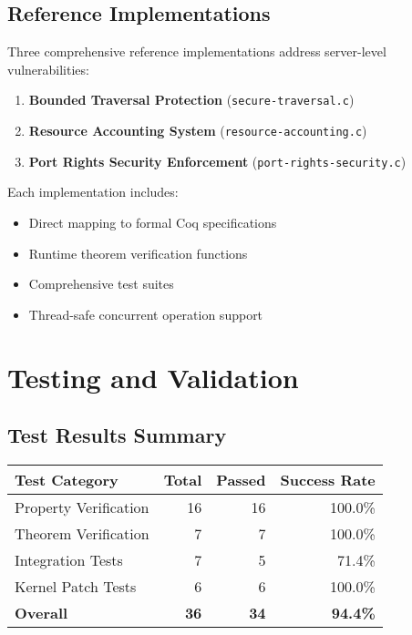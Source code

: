 \documentclass[11pt,a4paper]{article}
\begin{document}
\subsection{Reference Implementations}

Three comprehensive reference implementations address server-level vulnerabilities:

\begin{enumerate}
    \item \textbf{Bounded Traversal Protection} (\texttt{secure-traversal.c})
    \item \textbf{Resource Accounting System} (\texttt{resource-accounting.c})
    \item \textbf{Port Rights Security Enforcement} (\texttt{port-rights-security.c})
\end{enumerate}

Each implementation includes:
\begin{itemize}
    \item Direct mapping to formal Coq specifications
    \item Runtime theorem verification functions
    \item Comprehensive test suites
    \item Thread-safe concurrent operation support
\end{itemize}

\section{Testing and Validation}

\subsection{Test Results Summary}

\begin{center}
\begin{tabular}{|l|r|r|r|}
\hline
\textbf{Test Category} & \textbf{Total} & \textbf{Passed} & \textbf{Success Rate} \\
\hline
Property Verification & 16 & 16 & 100.0\% \\
Theorem Verification & 7 & 7 & 100.0\% \\
Integration Tests & 7 & 5 & 71.4\% \\
Kernel Patch Tests & 6 & 6 & 100.0\% \\
\hline
\textbf{Overall} & \textbf{36} & \textbf{34} & \textbf{94.4\%} \\
\hline
\end{tabular}
\end{center}
\end{document}
